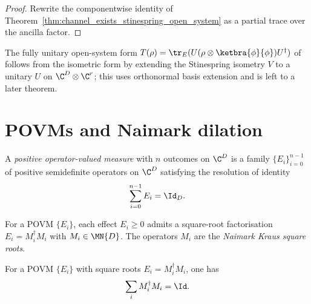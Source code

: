 \begin{proof}\leanok
    Rewrite the componentwise identity of
    Theorem~\ref{thm:channel_exists_stinespring_open_system} as a partial
    trace over the ancilla factor.
\end{proof}

\begin{remark}
    The fully unitary open-system form
    $T(\rho) = \tr_E(U (\rho \otimes \ketbra{\phi}{\phi})
        U^\dagger)$ of~\cite[Theorem~2.5]{Wolf2012Quantum} follows from the
    isometric form by extending the Stinespring isometry $V$ to a unitary
    $U$ on $\C^D \otimes \C^r$; this uses orthonormal basis extension and
    is left to a later theorem.
\end{remark}

\section{POVMs and Naimark dilation}
\label{sec:povm_naimark}

\begin{definition}\label{def:povm}
    \leanok
    A \emph{positive operator-valued measure} with $n$ outcomes on $\C^D$
    is a family $\{E_i\}_{i=0}^{n-1}$ of positive semidefinite
    operators on $\C^D$ satisfying the resolution of identity
    \[
        \sum_{i=0}^{n-1} E_i = \Id_D.
    \]
\end{definition}

\begin{definition}\label{def:naimark_kraus}
    \leanok
    For a POVM $\{E_i\}$, each effect $E_i \ge 0$ admits a square-root
    factorisation $E_i = M_i^\dagger M_i$ with $M_i \in \MN{D}$. The
    operators $M_i$ are the \emph{Naimark Kraus square roots}.
\end{definition}

\begin{theorem}
    \label{lem:naimark_square_root_normalization}
    \leanok
    For a POVM $\{E_i\}$ with square roots $E_i = M_i^\dagger M_i$,
    one has
    \[
        \sum_i M_i^\dagger M_i = \Id.
    \]
\end{theorem}

